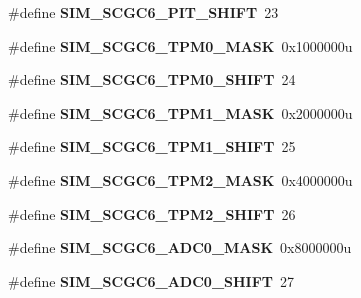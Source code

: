 \begin{DoxyCompactItemize}
\#define {\bfseries S\+I\+M\+\_\+\+S\+C\+G\+C6\+\_\+\+P\+I\+T\+\_\+\+S\+H\+I\+FT}~23
\item 
\mbox{\label{group___s_i_m___register___masks_gad879476f2922fd7dad2f65d3d052e95d}} 
\#define {\bfseries S\+I\+M\+\_\+\+S\+C\+G\+C6\+\_\+\+T\+P\+M0\+\_\+\+M\+A\+SK}~0x1000000u
\item 
\mbox{\label{group___s_i_m___register___masks_ga9e379c439a6d1d14f65b4c58c46453c5}} 
\#define {\bfseries S\+I\+M\+\_\+\+S\+C\+G\+C6\+\_\+\+T\+P\+M0\+\_\+\+S\+H\+I\+FT}~24
\item 
\mbox{\label{group___s_i_m___register___masks_ga94a77c9065fd06f267b9920024067cd6}} 
\#define {\bfseries S\+I\+M\+\_\+\+S\+C\+G\+C6\+\_\+\+T\+P\+M1\+\_\+\+M\+A\+SK}~0x2000000u
\item 
\mbox{\label{group___s_i_m___register___masks_ga26bf0c38385affd6680bb0f4853e43df}} 
\#define {\bfseries S\+I\+M\+\_\+\+S\+C\+G\+C6\+\_\+\+T\+P\+M1\+\_\+\+S\+H\+I\+FT}~25
\item 
\mbox{\label{group___s_i_m___register___masks_ga6e18a8c1e42f318d03294d14df255132}} 
\#define {\bfseries S\+I\+M\+\_\+\+S\+C\+G\+C6\+\_\+\+T\+P\+M2\+\_\+\+M\+A\+SK}~0x4000000u
\item 
\mbox{\label{group___s_i_m___register___masks_gafc1cb84a2b2b306b043c31ed98213ff0}} 
\#define {\bfseries S\+I\+M\+\_\+\+S\+C\+G\+C6\+\_\+\+T\+P\+M2\+\_\+\+S\+H\+I\+FT}~26
\item 
\mbox{\label{group___s_i_m___register___masks_ga481c725e02da6a245c9d715307969f09}} 
\#define {\bfseries S\+I\+M\+\_\+\+S\+C\+G\+C6\+\_\+\+A\+D\+C0\+\_\+\+M\+A\+SK}~0x8000000u
\item 
\mbox{\label{group___s_i_m___register___masks_ga3f62de5fc5ccaa13d6975cf1e0ebba03}} 
\#define {\bfseries S\+I\+M\+\_\+\+S\+C\+G\+C6\+\_\+\+A\+D\+C0\+\_\+\+S\+H\+I\+FT}~27
\item 
\mbox{\label{group___s_i_m___register___masks_gad51b16006c9f793c4b342ea1ff91a846}} 

\end{DoxyCompactItemize}
